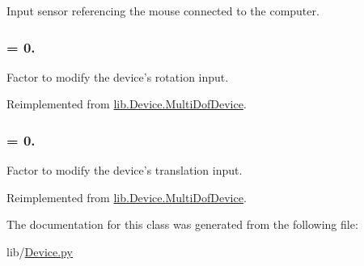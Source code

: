 \-Input sensor referencing the mouse connected to the computer. 

\hypertarget{classlib_1_1Device_1_1KeyboardMouseDevice_a1587b95d293ad632c16f7e065f879f12}{
\subsubsection[{rotation\-\_\-factor}]{ = 0.}}\label{classlib_1_1Device_1_1KeyboardMouseDevice_a1587b95d293ad632c16f7e065f879f12}


\-Factor to modify the device's rotation input. 



\-Reimplemented from \hyperlink{classlib_1_1Device_1_1MultiDofDevice_a04b79f1c36851426cd8845111d3d7e5f}{lib.\-Device.\-Multi\-Dof\-Device}.

\hypertarget{classlib_1_1Device_1_1KeyboardMouseDevice_aaf8a0ccdb6ab57e3e7b6710b137af971}{
\subsubsection[{translation\-\_\-factor}]{ = 0.}}\label{classlib_1_1Device_1_1KeyboardMouseDevice_aaf8a0ccdb6ab57e3e7b6710b137af971}


\-Factor to modify the device's translation input. 



\-Reimplemented from \hyperlink{classlib_1_1Device_1_1MultiDofDevice_a92b1c30e0edb14afd629c053d6719594}{lib.\-Device.\-Multi\-Dof\-Device}.



\-The documentation for this class was generated from the following file\-:\begin{DoxyCompactItemize}
\item 
lib/\hyperlink{Device_8py}{\-Device.\-py}\end{DoxyCompactItemize}

